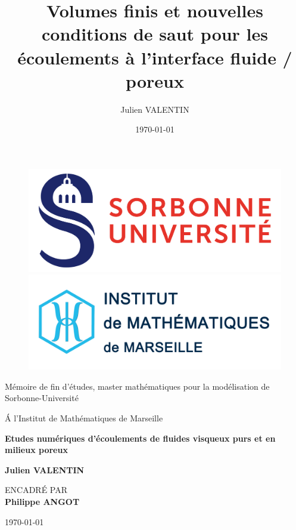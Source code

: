 
\title{Volumes finis et nouvelles conditions de saut pour les écoulements à l'interface fluide / poreux}
\author{Julien VALENTIN}
\date{\today}

\thispagestyle{empty}
	
	\begin{figure}[ht]

			\includegraphics[scale=.06]{Images/Logo_SU.png}
			\label{Logo_SU}
	   \endminipage
			\includegraphics[scale=.49]{Images/Logo_I2M.png}
			\label{Logo_I2M}
		\endminipage
	\end{figure}
	
	\begin{center}
	\vspace{1.5cm}
	\LARGE
	Mémoire de fin d'études, master mathématiques pour la modélisation de Sorbonne-Université 
	
	\vspace{0.8cm}
	\LARGE
	\'A l'Institut de Mathématiques de Marseille

	
	\vspace{3cm}	
	\Large
	\textbf{Etudes numériques d'écoulements de fluides visqueux purs et en milieux poreux}

	\vspace{4cm}
	\normalsize	
	\vspace{.3cm}
	\large
	\textbf{Julien VALENTIN}
	
	\vspace{1.7cm}
	\normalsize	
    ENCADR\'E PAR  \\
	\vspace{.3cm}
	\large
	\textbf{Philippe ANGOT}
	
	\vspace{1.3cm}

	\vfill
	\today
	\end{center}